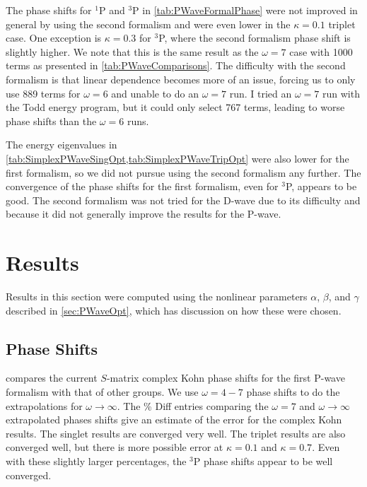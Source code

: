 \documentclass[Dissertation.tex]{subfiles}
\begin{document}
The phase shifts for $^1$P and $^3$P in \cref{tab:PWaveFormalPhase} were not 
improved in general by using the second formalism and were even lower in
the $\kappa = 0.1$ triplet case.
One exception is $\kappa = 0.3$ for $^3$P, where the second formalism phase shift
is slightly higher. We note that this is the same result as the $\omega = 7$
case with 1000 terms as presented in \cref{tab:PWaveComparisons}.
The difficulty with the second formalism is that linear dependence becomes more
of an issue, forcing us to only use 889 terms for $\omega = 6$ and unable to
do an $\omega = 7$ run. I tried an $\omega = 7$ run with the Todd energy
program, but it could only select 767 terms, leading to worse phase shifts than
the $\omega = 6$ runs.

The energy eigenvalues in \cref{tab:SimplexPWaveSingOpt,tab:SimplexPWaveTripOpt}
were also lower for the first formalism, so we did not pursue using the second
formalism any further. The convergence of the phase shifts for the first
formalism, even for $^3$P, appears to be good. The second formalism was not
tried for the D-wave due to its difficulty and because it did not generally
improve the results for the P-wave. %


\section{Results}

Results in this section were computed using the nonlinear parameters $\alpha$,
$\beta$, and $\gamma$ described in \cref{sec:PWaveOpt}, which has discussion
on how these were chosen.

\subsection{Phase Shifts}

 compares the current $S$-matrix complex Kohn phase shifts for the 
first P-wave formalism with that of other groups. We use $\omega = 4 - 7$ 
phase shifts to do the extrapolations for $\omega \rightarrow \infty$. The
\% Diff entries comparing the $\omega = 7$ and $\omega \to \infty$ extrapolated
phases shifts give an estimate of the error for the complex Kohn results. The singlet 
results are converged very well. The triplet results are also converged well, 
but there is more possible error at $\kappa = 0.1$ and $\kappa = 0.7$. Even 
with these slightly larger percentages, the $^3$P phase shifts appear to be 
well converged.
\end{document}
